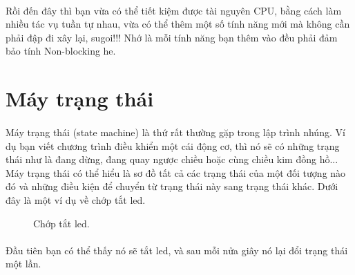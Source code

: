 \documentclass[12pt,a5paper]{book}
\begin{document}
\paragraph{}
Rồi đến đây thì bạn vừa có thể tiết kiệm được tài nguyên CPU, bằng cách làm nhiều tác vụ tuần tự nhau, vừa có thể thêm một số tính năng mới mà không cần phải đập đi xây lại, sugoi!!! Nhớ là mỗi tính năng bạn thêm vào đều phải đảm bảo tính Non-blocking he.
\section{Máy trạng thái}
\paragraph{}
Máy trạng thái (state machine) là thứ rất thường gặp trong lập trình nhúng. Ví dụ bạn viết chương trình điều khiển một cái động cơ, thì nó sẽ có những trạng thái như là đang dừng, đang quay ngược chiều hoặc cùng chiều kim đồng hồ... Máy trạng thái có thể hiểu là sơ đồ tất cả các trạng thái của một đối tượng nào đó và những điều kiện để chuyển từ trạng thái này sang trạng thái khác. Dưới đây là một ví dụ về chớp tắt led.
\begin{figure}[h!]
	\centering
{}
\caption{Chớp tắt led.}
\end{figure}
\paragraph{}
Đầu tiên bạn có thể thấy nó sẽ tắt led, và sau mỗi nửa giây nó lại đổi trạng thái một lần.
\end{document}
